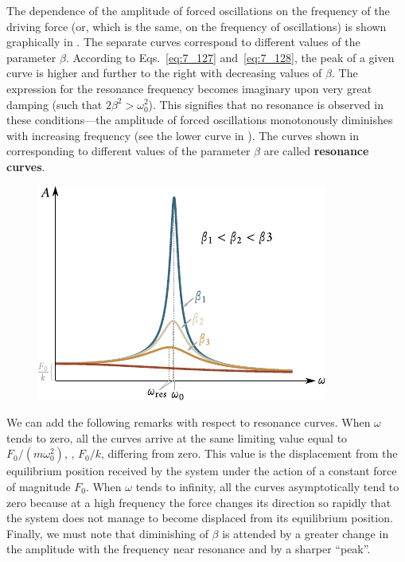The dependence of the amplitude of forced oscillations on the frequency of the driving force (or, which is the same, on the frequency of oscillations) is shown graphically in . The separate curves correspond to different values of the parameter $\beta$. According to Eqs.~\eqref{eq:7_127} and~\eqref{eq:7_128}, the peak of a given curve is higher and further to the right with decreasing values of $\beta$. The expression for the resonance frequency becomes imaginary upon very great damping (such that $2\beta^2>\omega_0^2$). This signifies that no resonance is observed in these conditions---the amplitude of forced oscillations monotonously diminishes with increasing frequency (see the lower curve in ). The curves shown in  corresponding to different values of the parameter $\beta$ are called \textbf{resonance curves}.

\begin{figure}[t]
	\begin{center}
		\includegraphics[scale=0.95]{figures/ch_07/fig_7_24.pdf}
		\caption[]{}
		\label{fig:7_24}
	\end{center}
	\vspace{-0.8cm}
\end{figure}

We can add the following remarks with respect to resonance curves. When $\omega$ tends to zero, all the curves arrive at the same limiting value equal to $F_0/(m\omega_0^2)$, \ie, $F_0/k$, differing from zero. This value is the displacement from the equilibrium position received by the system under the action of a constant force of magnitude $F_0$. When $\omega$ tends to infinity, all the curves asymptotically tend to zero because at a high frequency the force changes its direction so rapidly that the system does not manage to become displaced from its equilibrium position. Finally, we must note that diminishing of $\beta$ is attended by a greater change in the amplitude with the frequency near resonance and by a sharper ``peak''.

